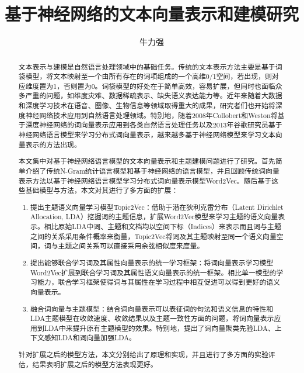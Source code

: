 \documentclass[master]{njuthesis}
\title{基于神经网络的文本向量表示和建模研究 }
\author{牛力强}
\institute{南京大学}
\begin{document}

\maketitle
\makeenglishtitle


\frontmatter

\begin{abstract}

文本表示与建模是自然语言处理领域中的基础任务。传统的文本表示方法主要是基于词袋模型，将文本映射至一个由所有存在的词项组成的一个高维0/1空间，若出现，则对应维度置为1，否则置为0。词袋模型的好处在于简单高效，容易扩展，但同时也面临众多严重的问题，如维度灾难、数据稀疏表示、缺失语义表达能力等。近年来随着大数据和深度学习技术在语音、图像、生物信息等领域取得重大的成果，研究者们也开始将深度神经网络技术应用到自然语言处理领域。特别地，随着2008年Collobert和Weston将基于深度神经网络的词向量表示应用到各类自然语言处理任务以及2013年谷歌研究员基于神经网络语言模型来学习分布式词向量表示，越来越多基于神经网络模型来学习文本向量表示的方法出现。

本文集中对基于神经网络语言模型的文本向量表示和主题建模问题进行了研究。首先简单介绍了传统N-Gram统计语言模型和基于神经网络的语言模型，并且回顾传统词向量表示方法以基于神经网络语言模型学习分布式词向量表示模型Word2Vec。随后基于这些基础模型与方法，本文对其进行了多方面的扩展：

\begin{enumerate}
\item 提出主题语义向量学习模型Topic2Vec：借助于潜在狄利克雷分布（Latent Dirichlet Allocation, LDA）挖掘词的主题信息，扩展Word2Vec模型来学习主题的语义向量表示。相比原始LDA中词、主题和文档均以空间下标（Indices）来表示而且词与主题之间的关系采用条件概率来衡量，Topic2Vec将词及其主题映射至同一个语义向量空间，词与主题之间关系可以直接采用余弦相似度来度量。
\item 提出能够联合学习词及其属性向量表示的统一学习框架：将词向量表示学习模型Word2Vec扩展到联合学习词及其属性语义向量表示的统一框架。相比单一模型的学习能力，联合学习框架使得词与其属性在学习过程中相互促进可以得到更好的语义向量表示。
\item 融合词向量与主题模型：结合词向量表示可以表征词的句法和语义信息的特性和LDA主题模型在收敛速度、收敛结果以及主题一致性方面的问题，将词向量表示应用到LDA中来提升原有主题模型的效果。特别地，提出了词向量聚类先验LDA、上下文感知LDA和词向量加强LDA。
\end{enumerate}
针对扩展之后的模型方法，本文分别给出了原理和实现，并且进行了多方面的实验评估，结果表明扩展之后的模型方法表现更好。


\end{abstract}
\end{document}
